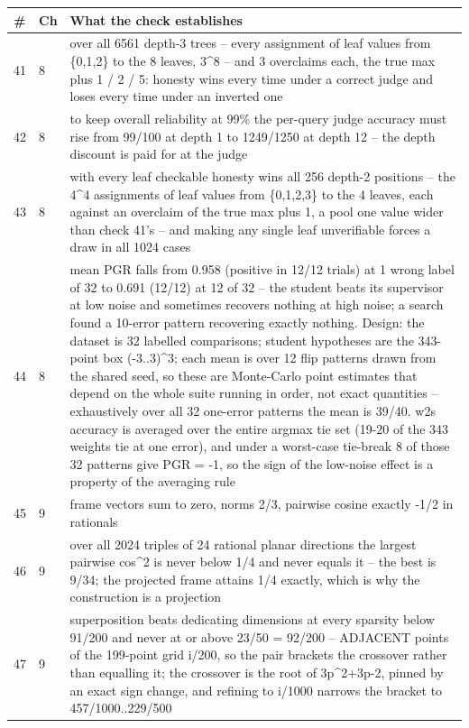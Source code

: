 \par\medskip
\noindent
\begin{tabularx}{\textwidth}{llX}
\toprule
\# & Ch & What the check establishes \\
\midrule
41 & 8 & over all 6561 depth-3 trees -- every assignment of leaf values from \{0,1,2\} to the 8 leaves, 3\textasciicircum{}8 -- and 3 overclaims each, the true max plus 1 / 2 / 5: honesty wins every time under a correct judge and loses every time under an inverted one \\
42 & 8 & to keep overall reliability at 99\% the per-query judge accuracy must rise from 99/100 at depth 1 to 1249/1250 at depth 12 -- the depth discount is paid for at the judge \\
43 & 8 & with every leaf checkable honesty wins all 256 depth-2 positions -- the 4\textasciicircum{}4 assignments of leaf values from \{0,1,2,3\} to the 4 leaves, each against an overclaim of the true max plus 1, a pool one value wider than check 41's -- and making any single leaf unverifiable forces a draw in all 1024 cases \\
44 & 8 & mean PGR falls from 0.958 (positive in 12/12 trials) at 1 wrong label of 32 to 0.691 (12/12) at 12 of 32 -- the student beats its supervisor at low noise and sometimes recovers nothing at high noise; a search found a 10-error pattern recovering exactly nothing. Design: the dataset is 32 labelled comparisons; student hypotheses are the 343-point box (-3..3)\textasciicircum{}3; each mean is over 12 flip patterns drawn from the shared seed, so these are Monte-Carlo point estimates that depend on the whole suite running in order, not exact quantities -- exhaustively over all 32 one-error patterns the mean is 39/40. w2s accuracy is averaged over the entire argmax tie set (19-20 of the 343 weights tie at one error), and under a worst-case tie-break 8 of those 32 patterns give PGR = -1, so the sign of the low-noise effect is a property of the averaging rule \\
45 & 9 & frame vectors sum to zero, norms 2/3, pairwise cosine exactly -1/2 in rationals \\
46 & 9 & over all 2024 triples of 24 rational planar directions the largest pairwise cos\textasciicircum{}2 is never below 1/4 and never equals it -- the best is 9/34; the projected frame attains 1/4 exactly, which is why the construction is a projection \\
47 & 9 & superposition beats dedicating dimensions at every sparsity below 91/200 and never at or above 23/50 = 92/200 -- ADJACENT points of the 199-point grid i/200, so the pair brackets the crossover rather than equalling it; the crossover is the root of 3p\textasciicircum{}2+3p-2, pinned by an exact sign change, and refining to i/1000 narrows the bracket to 457/1000..229/500 \\
\bottomrule
\end{tabularx}
